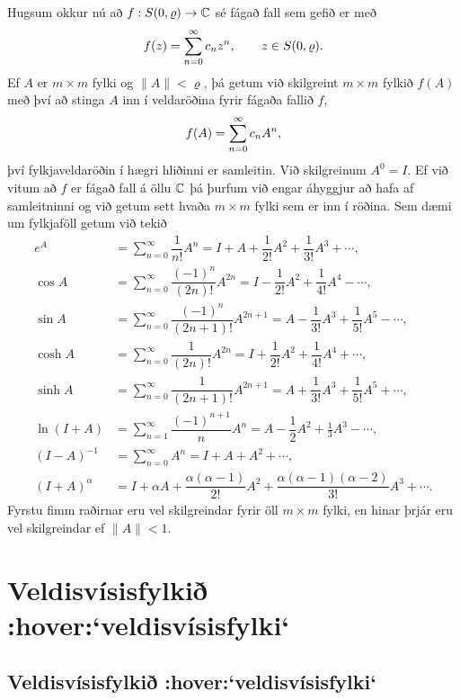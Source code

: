 Hugsum okkur nú að $f:S(0,\varrho)\to {\mathbb C}$ 
sé fágað fall sem gefið er með 
 $$f(z)=\sum_{n=0}\sp \infty c_n z\sp n, \qquad z\in S(0,\varrho).
 $$
Ef $A$ er $m\times m$ fylki og $\|A\|< \varrho$, þá getum við
skilgreint $m\times m$ fylkið $f(A)$ með því að stinga $A$ inn í
veldaröðina fyrir fágaða fallið $f$,   
 $$f(A)=\sum_{n=0}\sp \infty c_nA\sp n,
 $$
því fylkjaveldaröðin í hægri hliðinni er samleitin. Við skilgreinum
$A^0=I$.  Ef við vitum að
$f$ er fágað fall á öllu ${\mathbb C}$ þá þurfum við engar áhyggjur að hafa af
samleitninni og við getum sett hvaða $m\times m$ fylki sem er inn í röðina.
Sem dæmi um fylkjaföll getum við tekið
\begin{align*}
e^A&=\sum\limits_{n=0}^\infty\dfrac 1{n!}{A^n}
=I+A+\dfrac {1}{2!}A^2+\dfrac{1}{3!}A^3+\cdots,\\
\cos A&= \sum\limits_{n=0}^\infty \dfrac{(-1)^n}{(2n)!}A^{2n}
=I-\dfrac{1}{2!}A^2+\dfrac{1}{4!}A^4-\cdots,\\
\sin A &=\sum\limits_{n=0}^\infty\dfrac{(-1)^n}{(2n+1)!}A^{2n+1}
= A-\dfrac {1}{3!}A^3+\dfrac{1}{5!}A^5-\cdots,\\
\cosh A&=\sum\limits_{n=0}^\infty\dfrac{1}{(2n)!}A^{2n}
=I+\dfrac{1}{2!}A^2+\dfrac{1}{4!}A^4+\cdots,\\
\sinh A &=\sum\limits_{n=0}^\infty\dfrac{1}{(2n+1)!}A^{2n+1}
= A+\dfrac {1}{3!}A^3+\dfrac{1}{5!}A^5+\cdots,\\
\ln (I+A) &= \sum\limits_{n=1}^\infty\dfrac{(-1)^{n+1}}{n}A^n
=A-\dfrac{1}{2}A^2+\frac{1}3A^3-\cdots,\\
(I-A)^{-1}&=\sum\limits_{n=0}^\infty A^n
=I+A+A^2+\cdots, \\
(I+A)^\alpha&= I+\alpha A+ \dfrac{\alpha(\alpha-1)}{2!}A^2 + 
\dfrac {\alpha(\alpha-1)(\alpha-2)}{3!}A^3+\cdots.
\end{align*}
Fyrstu fimm raðirnar eru vel skilgreindar fyrir öll $m\times m$
fylki, en hinar þrjár eru vel skilgreindar  ef $\|A\|<1$.  

 


\section{Veldisvísisfylkið :hover:`veldisvísisfylki`}

\subsection{Veldisvísisfylkið :hover:`veldisvísisfylki`}

